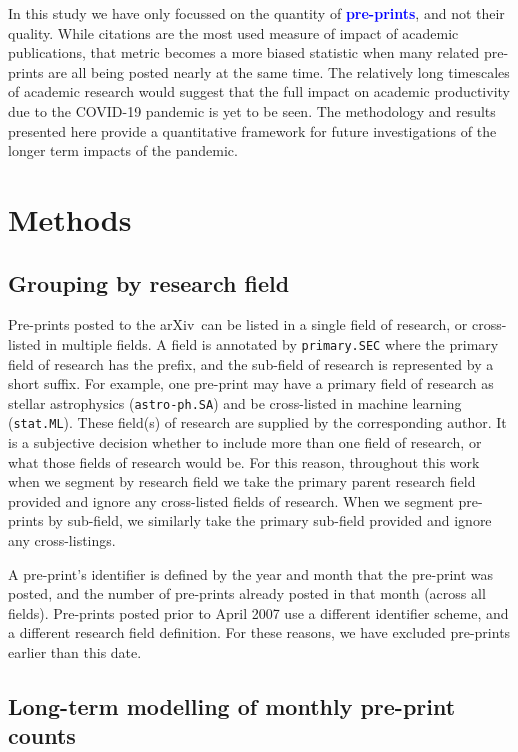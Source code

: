 \documentclass[]{rsos}%
\newcommand{\arxiv}{arXiv}
\newcommand{\change}[1]{\textcolor{blue}{\textbf{#1}}}
\begin{document}
In this study we have only focussed on the quantity of \change{pre-prints}, and not their quality. While citations are the most used measure of impact of academic publications, that metric becomes a more biased statistic when many related pre-prints are all being posted nearly at the same time\cite{Fassin:2021}. The relatively long timescales of academic research would suggest that the full impact on academic productivity due to the COVID-19 pandemic is yet to be seen. The methodology and results presented here provide a quantitative framework for future investigations of the longer term impacts of the pandemic.


\section*{Methods}

\subsection*{Grouping by research field}

Pre-prints posted to the \arxiv\ can be listed in a single field of research, or cross-listed in multiple fields. A field is annotated by \texttt{primary.SEC} where the primary field of research has the prefix, and the sub-field of research is represented by a short suffix. For example, one pre-print may have a primary field of research as stellar astrophysics (\texttt{astro-ph.SA}) and be cross-listed in machine learning (\texttt{stat.ML}). These field(s) of research are supplied by the corresponding author. It is a subjective decision whether to include more than one field of research, or what those fields of research would be. For this reason, throughout this work when we segment by research field we take the primary parent research field provided and ignore any cross-listed fields of research. When we segment pre-prints by sub-field, we similarly take the primary sub-field provided and ignore any cross-listings.

A pre-print's identifier is defined by the year and month that the pre-print was posted, and the number of pre-prints already posted in that month (across all fields). Pre-prints posted prior to April 2007 use a different identifier scheme, and a different research field definition. For these reasons, we have excluded pre-prints earlier than this date. 


\subsection*{Long-term modelling of monthly pre-print counts}
\end{document}

